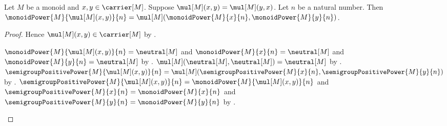 \begin{theorem}\label{monoid_power_of_commuting_product}
    Let $M$ be a monoid and $x,y\in\carrier[M]$.
    Suppose $\mul[M](x,y)=\mul[M](y,x)$.
    Let $n$ be a natural number.
    Then
        $\monoidPower{M}{\mul[M](x,y)}{n}
            =\mul[M](\monoidPower{M}{x}{n},
                \monoidPower{M}{y}{n})$.
\end{theorem}
\begin{proof}
    Hence $\mul[M](x,y)\in\carrier[M]$ by .
    \begin{byCase}
            $\monoidPower{M}{\mul[M](x,y)}{n}=\neutral[M]$ and
                $\monoidPower{M}{x}{n}=\neutral[M]$ and
                $\monoidPower{M}{y}{n}=\neutral[M]$ by
                .
            $\mul[M](\neutral[M],\neutral[M])=\neutral[M]$ by
                .
            $\semigroupPositivePower{M}{\mul[M](x,y)}{n}
                =\mul[M](\semigroupPositivePower{M}{x}{n},
                    \semigroupPositivePower{M}{y}{n})$ by
                .
            $\semigroupPositivePower{M}{\mul[M](x,y)}{n}
                =\monoidPower{M}{\mul[M](x,y)}{n}$ and
                $\semigroupPositivePower{M}{x}{n}
                    =\monoidPower{M}{x}{n}$ and
                $\semigroupPositivePower{M}{y}{n}
                    =\monoidPower{M}{y}{n}$ by
                .
    \end{byCase}
\end{proof}

